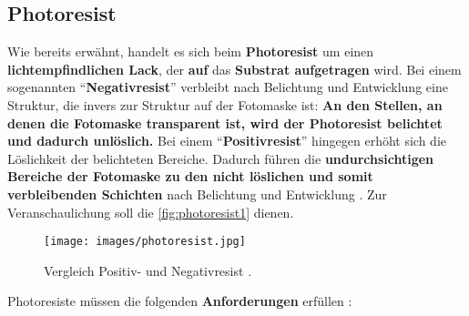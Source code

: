 \documentclass{article} %
\begin{document}
\vspace{1em}

\subsection{Photoresist}

Wie bereits erwähnt, handelt es sich beim \textbf{Photoresist} um einen \textbf{lichtempfindlichen Lack}, der \textbf{auf} das \textbf{Substrat aufgetragen} wird. Bei einem sogenannten ``\textbf{Negativresist}'' verbleibt nach Belichtung und Entwicklung eine Struktur, die invers zur Struktur auf der Fotomaske ist: \textbf{An den Stellen, an denen die Fotomaske transparent ist, wird der Photoresist belichtet und dadurch unlöslich.} Bei einem ``\textbf{Positivresist}'' hingegen erhöht sich die Löslichkeit der belichteten Bereiche. Dadurch führen die \textbf{undurchsichtigen Bereiche der Fotomaske zu den nicht löslichen und somit verbleibenden Schichten} nach Belichtung und Entwicklung \cite{gerald2006}. Zur Veranschaulichung soll die \autoref{fig:photoresist1} dienen.

\begin{figure}[htb!]
    \centering
    \texttt{[image: images/photoresist.jpg]} %
    \captionsetup{labelfont=bf} %
    \caption{Vergleich Positiv- und Negativresist \cite{sciencedirect_photoresist}.}
    \label{fig:photoresist1}
\end{figure}

\vspace{1em}

Photoresiste müssen die folgenden \textbf{Anforderungen} erfüllen \cite{schmid2024}:
\end{document}
